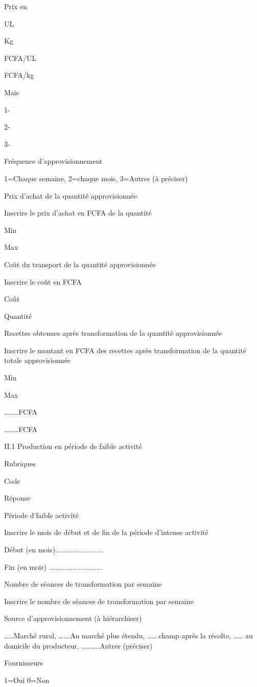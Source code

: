\documentclass[12pt,oneside]{report}
\begin{document}
Prix en

UL

Kg

FCFA/UL

FCFA/kg

Maïs

1-

2-

3-

Fréquence d’approvisionnement

1=Chaque semaine, 2=chaque mois, 3=Autres (à préciser)

Prix d’achat de la quantité approvisionnée

Inscrire le prix d’achat en FCFA de la quantité

Min

Max

Coût du transport de la quantité approvisionnée

Inscrire le coût en FCFA

Coût

Quantité

Recettes obtenues après transformation de la quantité approvisionnée

Inscrire le montant en FCFA des recettes après transformation de la quantité totale approvisionnée

Min

Max

………FCFA

………FCFA

II.1 Production en période de faible activité

Rubriques

Code

Réponse

Période d’faible activité

Inscrire le mois de début et de fin de la période d’intense activité

Début (en mois)........................

Fin (en mois) ...........................

Nombre de séances de transformation par semaine

Inscrire le nombre de séances de transformation par semaine

Source d’approvisionnement (à hiérarchiser)

……Marché rural, …….Au marché plus étendu, …….champ après la récolte, …… au domicile du producteur, ………..Autres (préciser)

Fournisseurs

1=Oui 0=Non
\end{document}
